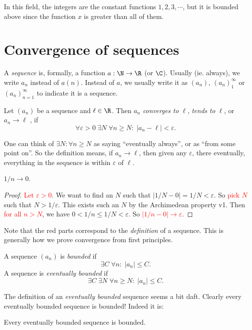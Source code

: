 \documentclass[a4paper]{article}
\begin{document}
In this field, the integers are the constant functions $1, 2, 3, \cdots$, but it is bounded above since the function $x$ is greater than all of them.

\section{Convergence of sequences}
\begin{defi}[Sequence]
  A \emph{sequence} is, formally, a function $a: \N \to \R$ (or $\C$). Usually (ie. always), we write $a_n$ instead of $a(n)$. Instead of $a$, we usually write it as $(a_n)$, $(a_n)_1^\infty$ or $(a_n)_{n = 1}^\infty$ to indicate it is a sequence.
\end{defi}

\begin{defi}
  Let $(a_n)$ be a sequence and $\ell\in \R$. Then $a_n$ \emph{converges to} $\ell$, \emph{tends to} $\ell$, or $a_n \to \ell$ , if
  \[
    \forall \varepsilon > 0\;\exists N\; \forall n\geq N:\;|a_n - \ell| < \varepsilon.
  \]
\end{defi}
One can think of $\exists N : \forall n\geq N$ as saying ``eventually always'', or as ``from some point on''. So the definition means, if $a_n\to \ell$, then given any $\varepsilon$, there eventually, everything in the sequence is within $\varepsilon$ of $\ell$.

\begin{lemma}
  $1/n \to 0$.
\end{lemma}

\begin{proof}
  \textcolor{red}{Let $\varepsilon > 0$}. We want to find an $N$ such that $|1/N - 0| = 1/N < \varepsilon$. So \textcolor{red}{pick $N$} such that $N > 1/\varepsilon$. This exists such an $N$ by the Archimedean property v1. Then \textcolor{red}{for all $n > N$}, we have $0 < 1/n \leq 1/N < \varepsilon$. So \textcolor{red}{$|1/n - 0|\to \varepsilon$}.
\end{proof}
Note that the red parts correspond to the \emph{definition} of a sequence. This is generally how we prove convergence from first principles.

\begin{defi}
  A sequence $(a_n)$ is \emph{bounded} if
  \[
    \exists C\;\forall n:\;|a_n| \leq C.
  \]
  A sequence is \emph{eventually bounded} if
  \[
    \exists C\; \exists N\; \forall n\geq N:\; |a_n| \leq C.
  \]
\end{defi}
The definition of an \emph{eventually bounded} sequence seems a bit daft. Clearly every eventually bounded sequence is bounded! Indeed it is:
\begin{lemma}
  Every eventually bounded sequence is bounded.
\end{lemma}
\end{document}
